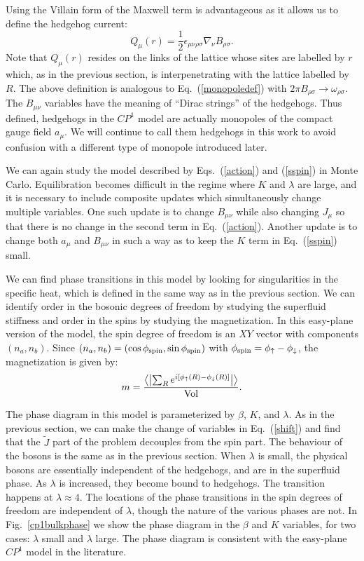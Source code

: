 \documentclass[prb,twocolumn]{revtex4-1}
\newcommand{\cp}{$CP^1$ }
\begin{document}
Using the Villain form of the Maxwell term is advantageous as it allows us to define the hedgehog current:
\begin{equation}
Q_\mu(r)=\frac{1}{2}\epsilon_{\mu\nu\rho\sigma}\nabla_\nu B_{\rho\sigma}.
\label{mondef}
\end{equation}
Note that $Q_\mu(r)$ resides on the links of the lattice whose sites are labelled by $r$ which, as in the previous section, is interpenetrating with the lattice labelled by $R$. The above definition is analogous to Eq.~(\ref{monopoledef}) with $2\pi B_{\rho\sigma}\rightarrow \omega_{\rho\sigma}$. The $B_{\mu\nu}$ variables have the meaning of ``Dirac strings'' of the hedgehogs. Thus defined, hedgehogs in the \cp model are actually monopoles of the compact gauge field $a_\mu$. We will continue to call them hedgehogs in this work to avoid confusion with a different type of monopole introduced later. 

We can again study the model described by Eqs.~(\ref{action}) and (\ref{sspin}) in Monte Carlo. Equilibration becomes difficult in the regime where $K$ and $\lambda$ are large, and it is necessary to include composite updates which simultaneously change multiple variables. One such update is to change $B_{\mu\nu}$ while also changing $J_\mu$ so that there is no change in the second term in Eq.~(\ref{action}). Another update is to change both $a_\mu$ and $B_{\mu\nu}$ in such a way as to keep the $K$ term in Eq.~(\ref{sspin}) small. 

We can find phase transitions in this model by looking for singularities in the specific heat, which is defined in the same way as in the previous section. We can identify order in the bosonic degrees of freedom by studying the superfluid stiffness and order in the spins by studying the magnetization. In this easy-plane version of the model, the spin degree of freedom is an $XY$ vector with components $(n_a,n_b)$.  Since $(n_a, n_b) = (\cos\phi_{\rm spin}, \sin\phi_{\rm spin})$ with $\phi_{\rm spin} = \phi_\uparrow - \phi_\downarrow$, the magnetization is given by:
\begin{equation}
m = \frac{\left\langle\left|\sum_R e^{i [\phi_\uparrow(R) - \phi_\downarrow(R)]}\right|\right\rangle}{\rm Vol}. 
\label{cp1mag}
\end{equation}

The phase diagram in this model is parameterized by $\beta$, $K$, and $\lambda$. As in the previous section, we can make the change of variables in Eq.~(\ref{shift}) and find that the $\tilde{J}$ part of the problem decouples from the spin part. The behaviour of the bosons is the same as in the previous section. When $\lambda$ is small, the physical bosons are essentially independent of the hedgehogs, and are in the superfluid phase. As $\lambda$ is increased, they become bound to hedgehogs. The transition happens at $\lambda\approx 4$. 
The locations of the phase transitions in the spin degrees of freedom are independent of $\lambda$, though the nature of the various phases are not. In Fig.~\ref{cp1bulkphase} we show the phase diagram in the $\beta$ and $K$ variables, for two cases: $\lambda$ small and $\lambda$ large. The phase diagram is consistent with the easy-plane $CP^1$ model in the literature.\cite{LesikSenthil} 
\end{document}
